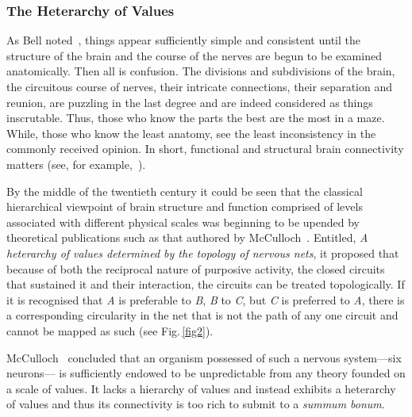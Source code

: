 \documentclass[10pt,letterpaper]{article}
\begin{document}
\subsubsection*{The Heterarchy of Values}

As Bell noted~\cite{bell11}, things appear sufficiently simple and consistent until the structure of the brain and the course of the nerves are begun to be examined anatomically. Then all is confusion. The divisions and subdivisions of the brain, the circuitous course of nerves, their intricate connections, their separation and reunion, are puzzling in the last degree and are indeed considered as things inscrutable. Thus, those who know the parts the best are the most in a maze. While, those who know the least anatomy, see the least inconsistency in the commonly received opinion. In short, functional and structural brain connectivity matters (see, for example,~\cite{gili18}).

By the middle of the twentieth century it could be seen that the classical hierarchical viewpoint of brain structure and function comprised of levels associated with different physical scales was beginning to be upended by theoretical publications such as that authored by McCulloch~\cite{mcculloch45a}. Entitled, {\it{A heterarchy of values determined by the topology of nervous nets}}, it proposed that because of both the reciprocal nature of purposive activity, the closed circuits that sustained it and their interaction, the circuits can be treated topologically. If it is recognised that {\it{A}} is preferable to {\it{B}}, {\it{B}} to {\it{C}}, but {\it{C}} is preferred to {\it{A}}, there is a  corresponding circularity in the net that is not the path of any one circuit and cannot be mapped as such (see Fig.\,\ref{fig2}).

McCulloch~\cite{mcculloch45a} concluded that an organism possessed of such a nervous system---six neurons--- is sufficiently endowed to be unpredictable from any theory founded on a scale of values. It lacks a hierarchy of values and instead exhibits a heterarchy of values and thus its connectivity is too rich to submit to a {\it{summum bonum}}.
\end{document}
